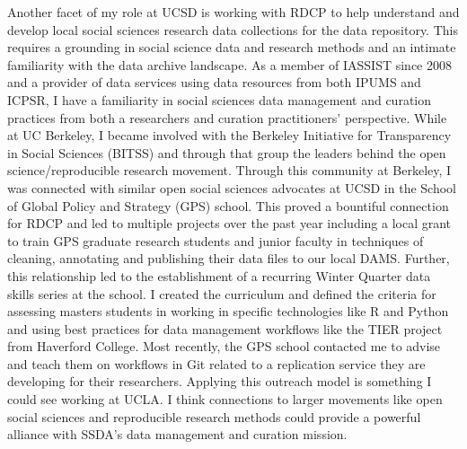 \documentclass[11pt,letterpaper,sans]{moderncv}
\begin{document}
Another facet of my role at UCSD is working with RDCP to help understand and develop local social sciences research data collections for the data repository.  This requires a grounding in social science data and research methods and an intimate familiarity with the data archive landscape.  As a member of IASSIST since 2008 and a provider of data services using data resources from both IPUMS and ICPSR, I have a familiarity in social sciences data management and curation practices from both a researchers and curation practitioners’ perspective.  While at UC Berkeley, I became involved with the Berkeley Initiative for Transparency in Social Sciences (BITSS) and through that group the leaders behind the open science/reproducible research movement.  Through this community at Berkeley, I was connected with similar open social sciences advocates at UCSD in the School of Global Policy and Strategy (GPS) school.  This proved a bountiful connection for RDCP and led to multiple projects over the past year including a local grant to train GPS graduate research students and junior faculty in techniques of cleaning, annotating and publishing their data files to our local DAMS. Further, this relationship led to the establishment of a recurring Winter Quarter data skills series at the school. I created the curriculum and defined the criteria for assessing masters students in working in specific technologies like R and Python and using best practices for data management workflows like the TIER project from Haverford College. Most recently, the GPS school contacted me to advise and teach them on workflows in Git related to a replication service they are developing for their researchers. Applying this outreach model is something I could see working at UCLA. I think connections to larger movements like open social sciences and reproducible research methods could provide a powerful alliance with SSDA’s data management and curation mission. 
\end{document}
